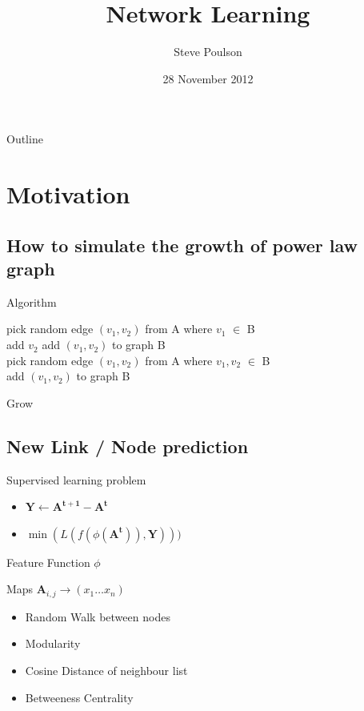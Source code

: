 \documentclass{beamer}
\title[Short Paper Title] %
{Network Learning}
\author[Author, Another] %
{Steve Poulson}
\institute[Universities of Somewhere and Elsewhere] %
{STG}
\date[CFP 2003] %
{28 November 2012}
\begin{document}
\begin{frame}
  \titlepage
\end{frame}

\begin{frame}{Outline}
  \tableofcontents
\end{frame}

\section{Motivation}

\subsection{How to simulate the growth of power law graph}

\begin{frame}{Algorithm}
\begin{algorithm}[H]
 \SetAlgoLined
 {
 	pick random edge $(v_1,v_2)$ from A where $v_1$ $\in$ B \\
 	add $v_2$
 	add $(v_1,v_2)$ to graph B\\
 }
  {
  	pick random edge $(v_1,v_2)$ from A where $v_1,v_2$ $\in$ B \\
 	add $(v_1,v_2)$ to graph B\\
  }
 \caption{Grow}
\end{algorithm}
\end{frame}
\subsection{New Link / Node prediction}

\begin{frame}{Supervised learning problem}


  \begin{itemize}
	\item $ \mathbf{Y}\leftarrow \mathbf{A^{t+1} }- \mathbf{A^t} $ 
	\pause
	\item $ \min(L ( f(\phi(\mathbf{A^t})) , \mathbf{Y})))$
	\pause
  \end{itemize}
\end{frame}

\begin{frame}{Feature Function $\phi$}

Maps $\mathbf{A}_{i,j} \rightarrow (x_1 \dots x_n)$  

  \begin{itemize}
	\item Random Walk between nodes
	\pause
	\item Modularity
	\pause
	\item Cosine Distance of neighbour list
	\pause
	\item Betweeness Centrality
  \end{itemize}
\end{frame}
\end{document}
